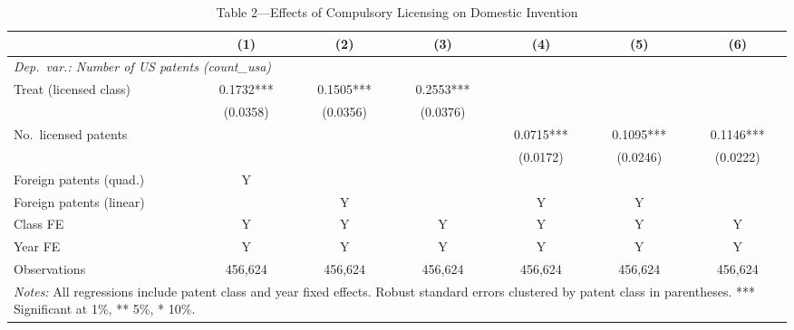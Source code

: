 \begin{table}[htbp]
\centering
\small
\caption{Table 2---Effects of Compulsory Licensing on Domestic Invention}
\label{tab:table2}
\begin{tabular}{lcccccc}
\toprule
 & (1) & (2) & (3) & (4) & (5) & (6) \\
\midrule
\multicolumn{7}{l}{\textit{Dep.\ var.: Number of US patents (count\_usa)}} \\
\addlinespace
Treat (licensed class) & 0.1732*** & 0.1505*** & 0.2553*** & & & \\
 & (0.0358) & (0.0356) & (0.0376) & & & \\
\addlinespace
No.\ licensed patents & & & & 0.0715*** & 0.1095*** & 0.1146*** \\
 & & & & (0.0172) & (0.0246) & (0.0222) \\
\addlinespace
Foreign patents (quad.) & Y & & & & & \\
Foreign patents (linear) & & Y & & Y & Y & \\
Class FE & Y & Y & Y & Y & Y & Y \\
Year FE & Y & Y & Y & Y & Y & Y \\
\addlinespace
Observations & 456,624 & 456,624 & 456,624 & 456,624 & 456,624 & 456,624 \\
\bottomrule
\multicolumn{7}{p{0.95\linewidth}}{\footnotesize
 \textit{Notes:} All regressions include patent class and year fixed effects.
 Robust standard errors clustered by patent class in parentheses.
 *** Significant at 1\%, ** 5\%, * 10\%.}
\end{tabular}
\end{table}
